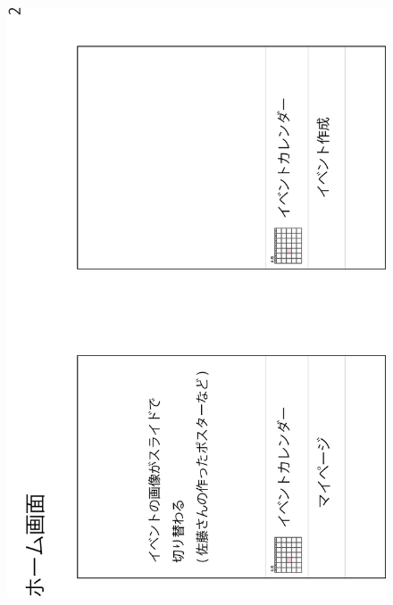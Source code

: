 \begin{figure}[ht]
    \begin{center}
    \includegraphics[keepaspectratio, scale=0.8]{appendixs/appendixA_figres/fig2.png}
    \end{center}
\end{figure}

